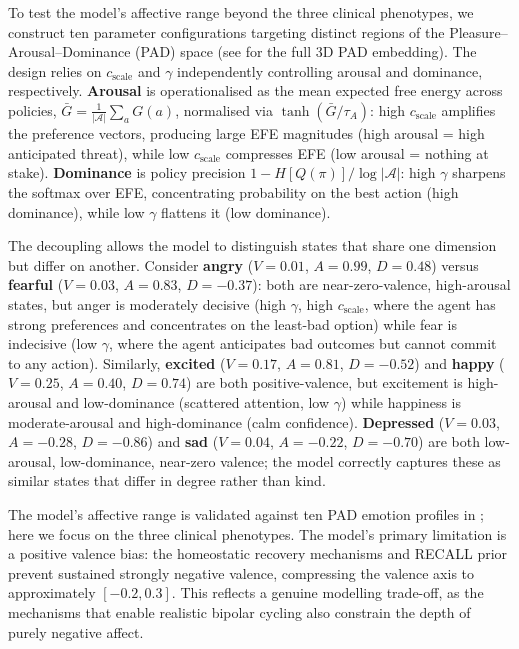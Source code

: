\documentclass[11pt,a4paper]{article}
\begin{document}
To test the model's affective range beyond the three clinical phenotypes, we construct ten parameter configurations targeting distinct regions of the Pleasure--Arousal--Dominance (PAD) space (see \citealt{albarracin2026temporal} for the full 3D PAD embedding). The design relies on $c_{\text{scale}}$ and $\gamma$ independently controlling arousal and dominance, respectively. \textbf{Arousal} is operationalised as the mean expected free energy across policies, $\bar{G} = \frac{1}{|\mathcal{A}|} \sum_a G(a)$, normalised via $\tanh(\bar{G} / \tau_A)$: high $c_{\text{scale}}$ amplifies the preference vectors, producing large EFE magnitudes (high arousal = high anticipated threat), while low $c_{\text{scale}}$ compresses EFE (low arousal = nothing at stake). \textbf{Dominance} is policy precision $1 - H[Q(\pi)] / \log|\mathcal{A}|$: high $\gamma$ sharpens the softmax over EFE, concentrating probability on the best action (high dominance), while low $\gamma$ flattens it (low dominance).

The decoupling allows the model to distinguish states that share one dimension but differ on another. Consider \textbf{angry} ($V = 0.01$, $A = 0.99$, $D = 0.48$) versus \textbf{fearful} ($V = 0.03$, $A = 0.83$, $D = -0.37$): both are near-zero-valence, high-arousal states, but anger is moderately decisive (high $\gamma$, high $c_{\text{scale}}$, where the agent has strong preferences and concentrates on the least-bad option) while fear is indecisive (low $\gamma$, where the agent anticipates bad outcomes but cannot commit to any action). Similarly, \textbf{excited} ($V = 0.17$, $A = 0.81$, $D = -0.52$) and \textbf{happy} ($V = 0.25$, $A = 0.40$, $D = 0.74$) are both positive-valence, but excitement is high-arousal and low-dominance (scattered attention, low $\gamma$) while happiness is moderate-arousal and high-dominance (calm confidence). \textbf{Depressed} ($V = 0.03$, $A = -0.28$, $D = -0.86$) and \textbf{sad} ($V = 0.04$, $A = -0.22$, $D = -0.70$) are both low-arousal, low-dominance, near-zero valence; the model correctly captures these as similar states that differ in degree rather than kind.

The model's affective range is validated against ten PAD emotion profiles in \citet{albarracin2026temporal}; here we focus on the three clinical phenotypes. The model's primary limitation is a positive valence bias: the homeostatic recovery mechanisms and RECALL prior prevent sustained strongly negative valence, compressing the valence axis to approximately $[-0.2, 0.3]$. This reflects a genuine modelling trade-off, as the mechanisms that enable realistic bipolar cycling also constrain the depth of purely negative affect.
\end{document}
